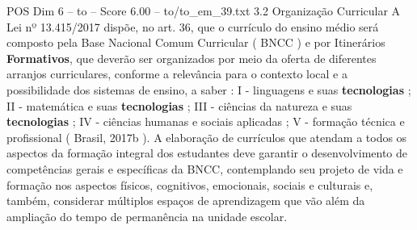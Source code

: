 \begin{textsample}{POS Dim 6 – to – Score 6.00 – to/to\_em\_39.txt}  \label{ex:f6_pos_180}
3.2 Organização Curricular A Lei nº 13.415/2017 dispõe, no art. 36, que o currículo do ensino médio será composto pela Base Nacional Comum Curricular ( BNCC ) e por Itinerários \textbf{Formativos}, que deverão ser organizados por meio da oferta de diferentes arranjos curriculares, conforme a relevância para o contexto local e a possibilidade dos sistemas de ensino, a saber : I - linguagens e suas \textbf{tecnologias} ; II - matemática e suas \textbf{tecnologias} ; III - ciências da natureza e suas \textbf{tecnologias} ; IV - ciências humanas e sociais aplicadas ; V - formação técnica e profissional ( Brasil, 2017b ).
A elaboração de currículos que atendam a todos os aspectos da formação integral dos estudantes deve garantir o desenvolvimento de competências gerais e específicas da BNCC, contemplando seu projeto de vida e formação nos aspectos físicos, cognitivos, emocionais, sociais e culturais e, também, considerar múltiplos espaços de aprendizagem que vão além da ampliação do tempo de permanência na unidade escolar.

\end{textsample}
